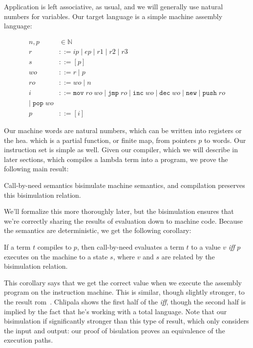 Application is left associative, as usual, and we will generally use natural
numbers for variables. Our target language is a simple machine assembly
language:

\begin{align}
  \tag{Word}   n, p &\in \mathbb{N} \\
  \tag{Registers} r &::= ip \; | \; ep \; | \; r1 \; | \; r2 \; | \; r3 \\
  \tag{Stack}     s &::= [p] \\
  \tag{Write Operands}  wo &::= r \; | \; p \\
  \tag{Read Operands}  ro &::= wo \; | \; n \\
  \tag{Instructions} i &::= \texttt{mov} \; ro \; wo \; 
                       | \; \texttt{jmp} \; ro \; 
                       | \; \texttt{inc} \; wo \;
                       | \; \texttt{dec} \; wo \;
                       | \; \texttt{new} \;  
                       | \; \texttt{push} \; ro \\
                       | \; \texttt{pop} \; wo \\
  \tag{Program}   p &::= [i]
\end{align}

Our machine words are natural numbers, which can be written into registers or
the hea. which is a partial function, or finite map, from pointers $p$ to
words. Our instruction set is simple as well. Given our compiler, which we will
describe in later sections, which compiles a lambda term into a program, we
prove the following main result:

\begin{theorem}
Call-by-need semantics bisimulate machine semantics, and compilation
preserves this bisimulation relation.
\end{theorem}

We'll formalize this more thoroughly later, but the bisimulation ensures that
we're correctly sharing the results of evaluation down to machine code. Because
the semantics are deterministic, we get the following corollary:   

\begin{corollary}
If a term $t$ compiles to $p$, then call-by-need evaluates a term $t$ to a value
$v$ \emph{iff} $p$ executes on the machine to a state $s$, where $v$ and $s$ are
related by the bisimulation relation.
\end{corollary}

This corollary says that we get the correct value when we execute the assembly
program on the instruction machine. This is similar, though slightly stronger,
to the result rom~\cite{chlipala2007certified}. Chlipala shows the first half of
the \emph{iff}, though the second half is implied by the fact that he's working
with a total language. Note that our bisimulation if significantly stronger than
this type of result, which only considers the input and output: our proof of
bisulation proves an equivalence of the execution paths.


